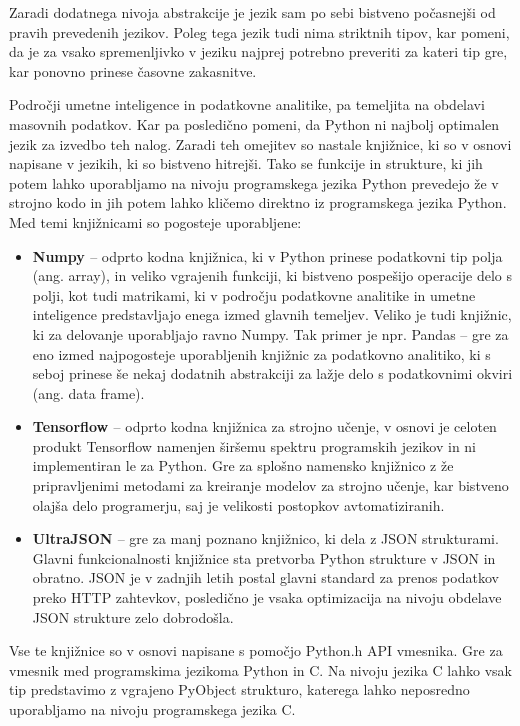 \documentclass[a4paper,12pt,openright]{book}
\begin{document}
   Zaradi dodatnega nivoja abstrakcije je jezik sam po sebi bistveno počasnejši od pravih prevedenih jezikov. Poleg tega jezik tudi nima striktnih tipov, kar pomeni, da je za vsako spremenljivko v jeziku najprej potrebno preveriti za kateri tip gre, kar ponovno prinese časovne zakasnitve.

    Področji umetne inteligence in podatkovne analitike, pa temeljita na obdelavi masovnih podatkov. Kar pa posledično pomeni, da Python ni najbolj optimalen jezik za izvedbo teh nalog. Zaradi teh omejitev so nastale knjižnice, ki so v osnovi napisane v jezikih, ki so bistveno hitrejši. Tako se funkcije in strukture, ki jih potem lahko uporabljamo na nivoju programskega jezika Python prevedejo že v strojno kodo in jih potem lahko kličemo direktno iz programskega jezika Python. Med temi knjižnicami so pogosteje uporabljene:
    \begin{itemize}
        \item \textbf{Numpy \cite{NUMPY_GITHUB}} – odprto kodna knjižnica, ki v Python prinese podatkovni tip polja (ang. array), in veliko vgrajenih funkciji, ki bistveno pospešijo operacije delo s polji, kot tudi matrikami, ki v področju podatkovne analitike in umetne inteligence predstavljajo enega izmed glavnih temeljev. Veliko je tudi knjižnic, ki za delovanje uporabljajo ravno Numpy. Tak primer je npr. Pandas \cite{PANDAS_GITHUB} – gre za eno izmed najpogosteje uporabljenih knjižnic za podatkovno analitiko, ki s seboj prinese še nekaj dodatnih abstrakciji za lažje delo s podatkovnimi okviri (ang. data frame).
        \item \textbf{Tensorflow \cite{TENSORFLOW_GITHUB}} –  odprto kodna knjižnica za strojno učenje, v osnovi je celoten produkt Tensorflow namenjen širšemu spektru programskih jezikov in ni implementiran le za Python. Gre za splošno namensko knjižnico z že pripravljenimi metodami za kreiranje modelov za strojno učenje, kar bistveno olajša delo programerju, saj je velikosti postopkov avtomatiziranih.
        \item \textbf{UltraJSON \cite{UJSON_GITHUB}} – gre za manj poznano knjižnico, ki dela z JSON strukturami. Glavni funkcionalnosti knjižnice sta pretvorba Python strukture v JSON in obratno. JSON je v zadnjih letih postal glavni standard za prenos podatkov preko HTTP zahtevkov, posledično je vsaka optimizacija na nivoju obdelave JSON strukture zelo dobrodošla. 
    \end{itemize}

    \noindent
    Vse te knjižnice so v osnovi napisane s pomočjo Python.h API vmesnika. Gre za vmesnik med programskima jezikoma Python in C. Na nivoju jezika C lahko vsak tip predstavimo z vgrajeno PyObject strukturo, katerega lahko neposredno uporabljamo na nivoju programskega jezika C. 
\end{document}
